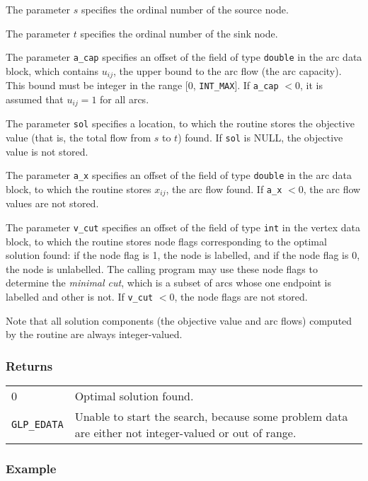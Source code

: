 The parameter $s$ specifies the ordinal number of the source node.

The parameter $t$ specifies the ordinal number of the sink node.

The parameter \verb|a_cap| specifies an offset of the field of type
\verb|double| in the arc data block, which contains $u_{ij}$, the upper
bound to the arc flow (the arc capacity). This bound must be integer in
the range [0, \verb|INT_MAX|]. If \verb|a_cap| $<0$, it is assumed that
$u_{ij}=1$ for all arcs.

The parameter \verb|sol| specifies a location, to which the routine
stores the objective value (that is, the total flow from $s$ to $t$)
found. If \verb|sol| is NULL, the objective value is not stored.

The parameter \verb|a_x| specifies an offset of the field of type
\verb|double| in the arc data block, to which the routine stores
$x_{ij}$, the arc flow found. If \verb|a_x| $<0$, the arc flow values
are not stored.

The parameter \verb|v_cut| specifies an offset of the field of type
\verb|int| in the vertex data block, to which the routine stores node
flags corresponding to the optimal solution found: if the node flag is
1, the node is labelled, and if the node flag is 0, the node is
unlabelled. The calling program may use these node flags to determine
the {\it minimal cut}, which is a subset of arcs whose one endpoint is
labelled and other is not. If \verb|v_cut| $<0$, the node flags are not
stored.

Note that all solution components (the objective value and arc flows)
computed by the routine are always integer-valued.

\newpage

\subsubsection*{Returns}

\def\arraystretch{1}

\begin{tabular}{@{}p{25mm}p{97.3mm}@{}}
0 & Optimal solution found.\\
\verb|GLP_EDATA| & Unable to start the search, because some problem
data are either not integer-valued or out of range.\\
\end{tabular}

\subsubsection*{Example}

